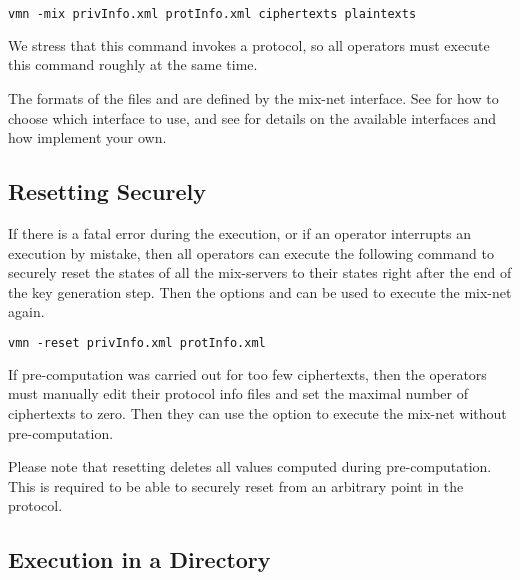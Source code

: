 \documentclass[11pt]{article}
\begin{document}
\begin{enumerate}
\vspace{0.3cm}
\begin{lstlisting}[frame=single,language=xml,
basicstyle=\tt,showstringspaces=false]
vmn -mix privInfo.xml protInfo.xml ciphertexts plaintexts
\end{lstlisting}

\vspace{0.2cm}
\noindent
We stress that this command invokes a protocol, so all operators must
execute this command roughly at the same time.

The formats of the files  and  are
defined by the mix-net interface. See  for how to
choose which interface to use, and see  for details on the
available interfaces and how implement your own.

\end{enumerate}

\subsection{Resetting Securely}

If there is a fatal error during the execution, or if an operator
interrupts an execution by mistake, then all operators can execute the
following command to securely reset the states of all the mix-servers
to their states right after the end of the key generation step. Then
the options  and  can be used to execute the
mix-net again.

\vspace{0.3cm}
\begin{lstlisting}[frame=single,language=xml,
basicstyle=\tt,showstringspaces=false]
vmn -reset privInfo.xml protInfo.xml
\end{lstlisting}

\vspace{0.2cm}
\noindent
If pre-computation was carried out for too few ciphertexts, then the
operators must manually edit their protocol info files and set the
maximal number of ciphertexts to zero. Then they can use the
 option to execute the mix-net without pre-computation.

Please note that resetting deletes all values computed during
pre-computation. This is required to be able to securely reset from an
arbitrary point in the protocol.


\subsection{Execution in a Directory}
\end{document}
